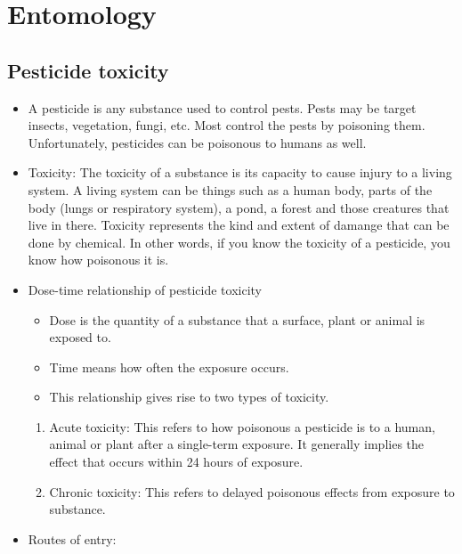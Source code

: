 \documentclass[
]{book}
\providecommand{\tightlist}{%
  \setlength{\itemsep}{0pt}\setlength{\parskip}{0pt}}
\begin{document}
\hypertarget{entomology}{%
\chapter{Entomology}\label{entomology}}

\hypertarget{pesticide-toxicity}{%
\section{Pesticide toxicity}\label{pesticide-toxicity}}

\begin{itemize}
\item
  A pesticide is any substance used to control pests. Pests may be target insects, vegetation, fungi, etc. Most control the pests by poisoning them. Unfortunately, pesticides can be poisonous to humans as well.
\item
  Toxicity: The toxicity of a substance is its capacity to cause injury to a living system. A living system can be things such as a human body, parts of the body (lungs or respiratory system), a pond, a forest and those creatures that live in there. Toxicity represents the kind and extent of damange that can be done by chemical. In other words, if you know the toxicity of a pesticide, you know how poisonous it is.
\item
  Dose-time relationship of pesticide toxicity

  \begin{itemize}
  \tightlist
  \item
    Dose is the quantity of a substance that a surface, plant or animal is exposed to.
  \item
    Time means how often the exposure occurs.
  \item
    This relationship gives rise to two types of toxicity.
  \end{itemize}

  \begin{enumerate}
  \def\labelenumi{\arabic{enumi}.}
  \tightlist
  \item
    Acute toxicity: This refers to how poisonous a pesticide is to a human, animal or plant after a single-term exposure. It generally implies the effect that occurs within 24 hours of exposure.
  \item
    Chronic toxicity: This refers to delayed poisonous effects from exposure to substance.
  \end{enumerate}
\item
  Routes of entry:


\end{itemize}
\end{document}
